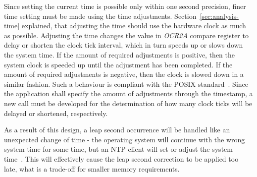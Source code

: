 Since setting the current time is possible only within one second precision,
finer time setting must be made using the time adjustments.
Section~\ref{sec:analysis-time} explained, that adjusting the time
should use the hardware clock as much as possible.
Adjusting the time changes the value in {\it{OCR2A}} compare register
to delay or shorten the clock tick interval,
which in turn speeds up or slows down the system time.
If the amount of required adjustments is positive, then the system clock is speeded up
until the adjustment has been completed.
If the amount of required adjustments is negative, then the clock is slowed down in a similar fashion.
Such a behaviour is compliant with the POSIX standard~\cite{posix}.
Since the application shall specify the amount of adjustments through the timestamp,
a new call must be developed for the determination of how many
clock ticks will be delayed or shortened, respectively.

As a result of this design, a leap second occurrence will be handled like an unexpected change of time -
the operating system will continue with the wrong system time for some time,
but an NTP client will set or adjust the system time~\cite{ntp-faq}.
This will effectively cause the leap second correction to be applied too late,
what is a trade-off for smaller memory requirements.
